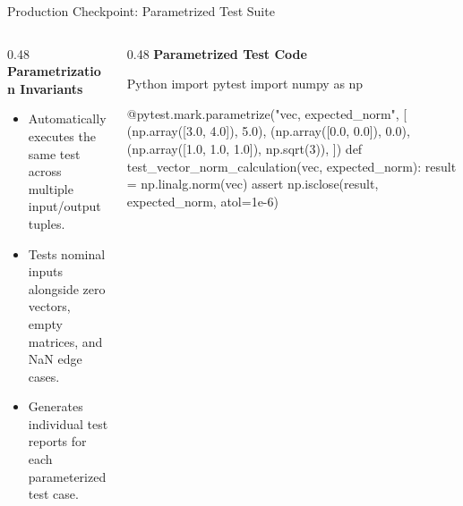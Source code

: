 \documentclass[../m00-session-04.tex]{subfiles}
\begin{document}
\begin{frame}[fragile]{Production Checkpoint: Parametrized Test Suite}
  \begin{columns}[T,onlytextwidth]
    \begin{column}{0.48\textwidth}
      {\small\bfseries\color{UpGradNight}Parametrization Invariants}\par\vspace{0.06cm}
      \begin{itemize}\setlength{\itemsep}{0.18em}\small
        \item Automatically executes the same test across multiple input/output tuples.
        \item Tests nominal inputs alongside zero vectors, empty matrices, and NaN edge cases.
        \item Generates individual test reports for each parameterized test case.
      \end{itemize}
      \vspace{0.04cm}
    \end{column}
    \hfill
    \begin{column}{0.48\textwidth}
      {\small\bfseries\color{UpGradRed}Parametrized Test Code}\par\vspace{0.04cm}
\begin{CodeBlock}{Python}
import pytest
import numpy as np

@pytest.mark.parametrize("vec, expected_norm", [
    (np.array([3.0, 4.0]), 5.0),
    (np.array([0.0, 0.0]), 0.0),
    (np.array([1.0, 1.0, 1.0]), np.sqrt(3)),
])
def test_vector_norm_calculation(vec, expected_norm):
    result = np.linalg.norm(vec)
    assert np.isclose(result, expected_norm, atol=1e-6)
\end{CodeBlock}
    \end{column}
  \end{columns}
\end{frame}
\end{document}
